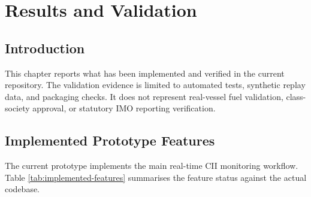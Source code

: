 \chapter{Results and Validation}
\label{chap:results}

\section{Introduction}
This chapter reports what has been implemented and verified in the current repository. The validation evidence is limited to automated tests, synthetic replay data, and packaging checks. It does not represent real-vessel fuel validation, class-society approval, or statutory IMO reporting verification.

\section{Implemented Prototype Features}
The current prototype implements the main real-time CII monitoring workflow. Table \ref{tab:implemented-features} summarises the feature status against the actual codebase.

